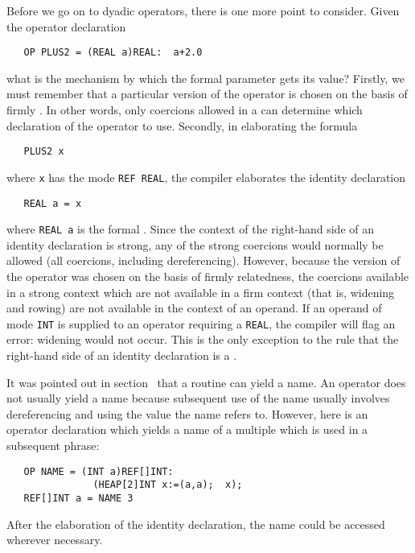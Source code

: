 Before we go on to dyadic operators, there is one more point to
consider. Given the operator declaration
\begin{verbatim}
   OP PLUS2 = (REAL a)REAL:  a+2.0
\end{verbatim}
\noindent
what is the mechanism by which the formal parameter gets its value?
Firstly, we must remember that a particular version of the operator is
chosen on the basis of firmly . In
other words, only coercions allowed in a
 can determine which declaration
of the operator to use.  Secondly, in elaborating the formula
\begin{verbatim}
   PLUS2 x
\end{verbatim}
\noindent
where \verb|x| has the mode \verb|REF REAL|, the compiler elaborates
the identity declaration
\begin{verbatim}
   REAL a = x
\end{verbatim}
\noindent
where \verb|REAL a| is the formal .
Since the context of the right-hand side of an identity declaration
is strong, any of the strong coercions would normally be allowed (all
coercions, including dereferencing).  However, because the version of
the operator was chosen on the basis of firmly relatedness, the
coercions available in a strong context which are not available in a
firm context (that is, widening and rowing) are not available in the
context of an operand.  If an operand of mode \verb|INT| is supplied
to an operator requiring a \verb|REAL|, the compiler will flag an
error: widening would not occur. This is the only exception to the
rule that the right-hand side of an identity declaration is a
.

It was pointed out in section~ that a routine can
yield a name.  An operator does not usually yield a name because
subsequent use of the name usually involves dereferencing and using
the value the name refers to.  However, here is an operator
declaration which yields a name of a multiple which is used in a
subsequent phrase:
\begin{verbatim}
   OP NAME = (INT a)REF[]INT:
               (HEAP[2]INT x:=(a,a);  x);
   REF[]INT a = NAME 3
\end{verbatim}
\noindent
After the elaboration of the identity declaration, the name could be
accessed wherever necessary.
\newpage

